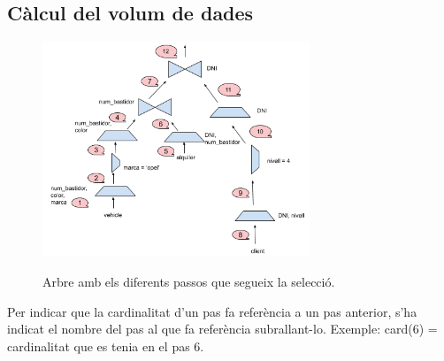 \documentclass[12pt]{article}
\begin{document}
\subsection{Càlcul del volum de dades}
\begin{figure}[H]
	\centering
	\includegraphics[width=8cm]{imgs/consnum.png}
	\label{fig:consnum}
	\caption{Arbre amb els diferents passos que segueix la selecció.}
\end{figure}
Per indicar que la cardinalitat d’un pas fa referència a un pas anterior, s’ha indicat el nombre del pas al que fa referència subrallant-lo. Exemple: card(6) = cardinalitat que es tenia en el pas 6.
\end{document}
